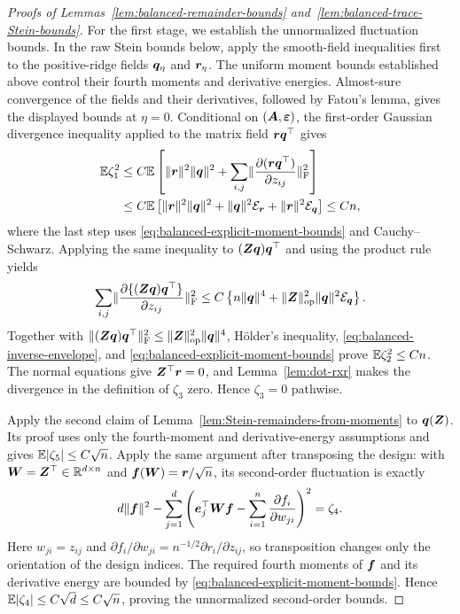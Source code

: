 \documentclass{article}
\theoremstyle{plain} %
\theoremstyle{definition} %
\theoremstyle{definition} %
\begin{document}
\begin{proof}[Proofs of Lemmas~\ref{lem:balanced-remainder-bounds}
and~\ref{lem:balanced-trace-Stein-bounds}]
For the first stage, we establish the unnormalized fluctuation bounds.
In the raw Stein bounds below, apply the smooth-field inequalities first to
the positive-ridge fields $\boldsymbol{q}_\eta$ and $\boldsymbol{r}_\eta$. The uniform moment
bounds established above control their fourth moments and derivative
energies. Almost-sure convergence of the fields and their derivatives,
followed by Fatou's lemma, gives the displayed bounds at $\eta=0$.
Conditional on $(\boldsymbol{A},{\boldsymbol{\varepsilon} })$, the first-order Gaussian divergence
inequality applied to the matrix field $\boldsymbol{r}\boldsymbol{q}^\top$ gives
\begin{align*}
    {\mathbb{E}}\zeta_1^2
    &\leq C{\mathbb{E}}\left[
       \lVert\boldsymbol{r}\rVert^2\lVert\boldsymbol{q}\rVert^2
       +\sum_{i,j}
          \lVert\pdv{(\boldsymbol{r}\boldsymbol{q}^\top)}{z_{ij}}\rVert_{\rm F}^2
    \right]\\
    &\leq C{\mathbb{E}}\left[
       \lVert\boldsymbol{r}\rVert^2\lVert\boldsymbol{q}\rVert^2
       +\lVert\boldsymbol{q}\rVert^2{\mathcal E}_{\boldsymbol{r}}
       +\lVert\boldsymbol{r}\rVert^2{\mathcal E}_{\boldsymbol{q}}
    \right]
    \leq Cn,
\end{align*}
where the last step uses \eqref{eq:balanced-explicit-moment-bounds} and
Cauchy--Schwarz.  Applying the same inequality to
$(\boldsymbol{Z}\boldsymbol{q})\boldsymbol{q}^\top$ and using the product rule yields
\begin{align*}
    \sum_{i,j}
       \lVert\pdv{\{(\boldsymbol{Z}\boldsymbol{q})\boldsymbol{q}^\top\}}{z_{ij}}\rVert_{\rm F}^2
    \leq C\left\{
       n\lVert\boldsymbol{q}\rVert^4
       +\lVert\boldsymbol{Z}\rVert_{\rm op}^2\lVert\boldsymbol{q}\rVert^2{\mathcal E}_{\boldsymbol{q}}
    \right\}.
\end{align*}
Together with
$\lVert(\boldsymbol{Z}\boldsymbol{q})\boldsymbol{q}^\top\rVert_{\rm F}^2
 \leq\lVert\boldsymbol{Z}\rVert_{\rm op}^2\lVert\boldsymbol{q}\rVert^4$,
H\"older's inequality, \eqref{eq:balanced-inverse-envelope}, and
\eqref{eq:balanced-explicit-moment-bounds} prove
${\mathbb{E}}\zeta_2^2\leq Cn$.  The normal equations give
$\boldsymbol{Z}^\top\boldsymbol{r}=0$, and Lemma~\ref{lem:dot-rxr} makes the
divergence in the definition of $\zeta_3$ zero.  Hence $\zeta_3=0$ pathwise.

Apply the second claim of
Lemma~\ref{lem:Stein-remainders-from-moments} to $\boldsymbol{q}(\boldsymbol{Z})$.  Its proof uses
only the fourth-moment and derivative-energy assumptions and gives
${\mathbb{E}}|\zeta_5|\leq C\sqrt n$.  Apply the same argument
after transposing the design: with $\boldsymbol{W}=\boldsymbol{Z}^\top\in{\mathbb{R}}^{d\times n}$ and
$\boldsymbol{f}(\boldsymbol{W})=\boldsymbol{r}/\sqrt n$, its second-order fluctuation is exactly
\begin{align*}
    d\lVert\boldsymbol{f}\rVert^2
    -\sum_{j=1}^d\left(
       \boldsymbol{e}_j^\top\boldsymbol{W}\boldsymbol{f}
       -\sum_{i=1}^n\pdv{f_i}{w_{ji}}
    \right)^2
    =\zeta_4.
\end{align*}
Here $w_{ji}=z_{ij}$ and
$\partial f_i/\partial w_{ji}
=n^{-1/2}\partial r_i/\partial z_{ij}$, so transposition
changes only the orientation of the design indices.
The required fourth moments of $\boldsymbol{f}$ and its derivative energy are bounded
by \eqref{eq:balanced-explicit-moment-bounds}.  Hence
${\mathbb{E}}|\zeta_4|\leq C\sqrt d\leq C\sqrt n$, proving the unnormalized
second-order bounds.


\end{proof}
\end{document}
